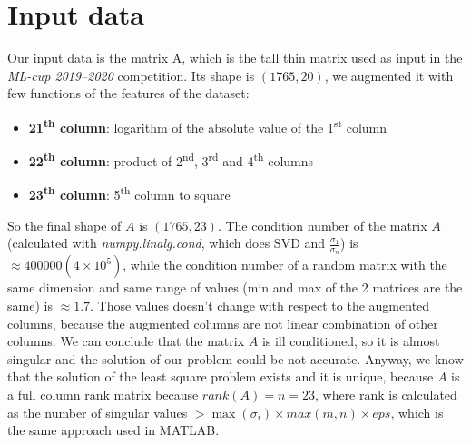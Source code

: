\documentclass{article}
\begin{document}
\section{Input data}\label{sec:input-data}
Our input data is the matrix A, which is the tall thin matrix used as input in the \textit{ML-cup 2019--2020} competition.
Its shape is $(1765, 20)$, we augmented it with few functions of the features of the dataset:
\begin{itemize}
	\item \textbf{21\textsuperscript{th} column}: logarithm of the absolute value of the 1\textsuperscript{st} column
	\item \textbf{22\textsuperscript{th} column}: product of 2\textsuperscript{nd}, 3\textsuperscript{rd} and 4\textsuperscript{th} columns
	\item \textbf{23\textsuperscript{th} column}: 5\textsuperscript{th} column to square
\end{itemize}
So the final shape of $A$ is $(1765, 23)$.
    The condition number of the matrix $A$ (calculated with \textit{numpy.linalg.cond}, which does SVD and $\frac{\sigma_{1}}{\sigma_{n}}$) is $\approx 400000 (4 \times 10^{5})$, while the condition number of a random matrix with the same dimension and same range of values (min and max of the 2 matrices are the same) is $\approx 1.7$.
    Those values doesn't change with respect to the augmented columns, because the augmented columns are not linear combination of other columns.
    We can conclude that the matrix $A$ is ill conditioned, so it is almost singular and the solution of our problem could be not accurate.
    Anyway, we know that the solution of the least square problem exists and it is unique, because $A$ is a full column rank matrix because $rank(A) = n = 23$, where rank is calculated as the number of singular values $> \max(\sigma_{i}) \times max(m, n) \times eps$, which is the same approach used in MATLAB.



\end{document}
